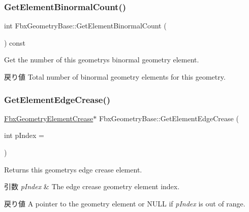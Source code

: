\subsubsection{\texorpdfstring{Get\+Element\+Binormal\+Count()}{GetElementBinormalCount()}}
{\footnotesize\ttfamily int Fbx\+Geometry\+Base\+::\+Get\+Element\+Binormal\+Count (\begin{DoxyParamCaption}{ }\end{DoxyParamCaption}) const}

Get the number of this geometry\textquotesingle{}s binormal geometry element. \begin{DoxyReturn}{戻り値}
Total number of binormal geometry elements for this geometry. 
\end{DoxyReturn}
\mbox{\label{class_fbx_geometry_base_acb7576ed7cf6011f456e6a3d30082058}} 
\subsubsection{\texorpdfstring{Get\+Element\+Edge\+Crease()}{GetElementEdgeCrease()}\hspace{0.1cm}{\footnotesize\ttfamily [1/2]}}
{\footnotesize\ttfamily \hyperlink{fbxlayer_8h_aa1db71d39153856548f192cf52aa2cc5}{Fbx\+Geometry\+Element\+Crease}$\ast$ Fbx\+Geometry\+Base\+::\+Get\+Element\+Edge\+Crease (\begin{DoxyParamCaption}\item[{int}]{p\+Index = {} }\end{DoxyParamCaption})}

Returns this geometry\textquotesingle{}s edge crease element. 
\begin{DoxyParams}{引数}
{\em p\+Index} & The edge crease geometry element index. \\
\hline
\end{DoxyParams}
\begin{DoxyReturn}{戻り値}
A pointer to the geometry element or {\ttfamily N\+U\+LL} if {\itshape p\+Index} is out of range. 
\end{DoxyReturn}
\mbox{\label{class_fbx_geometry_base_af596440c20b05b92559190449803b8e8}} 
